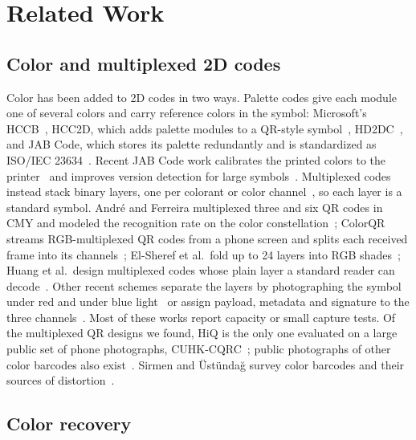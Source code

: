 \section{Related Work}
\label{sec:related}

\subsection{Color and multiplexed 2D codes}

Color has been added to 2D codes in two ways. Palette codes give each module one of
several colors and carry reference colors in the symbol: Microsoft's
HCCB~\cite{parikh2008hccb}, HCC2D, which adds palette modules to a QR-style
symbol~\cite{grillo2010hcc2d}, HD2DC~\cite{melgar2019hd2dc}, and JAB Code, which stores its
palette redundantly and is standardized as ISO/IEC 23634~\cite{berchtold2020jab,iso23634}.
Recent JAB Code work calibrates the printed colors to the printer~\cite{bugert2024calib}
and improves version detection for large symbols~\cite{bugert2025version}. Multiplexed
codes instead stack binary layers, one per colorant or color
channel~\cite{bulan2011elliptical,blasinski2013pccc}, so each layer is a standard symbol. Andr\'e and Ferreira multiplexed three and six QR codes in CMY and modeled
the recognition rate on the color constellation~\cite{andre2014colour}; ColorQR streams
RGB-multiplexed QR codes from a phone screen and splits each received frame into its
channels~\cite{toh2016colorqr}; El-Sheref et al.\ fold up to 24 layers into RGB
shades~\cite{elsheref2020fmt}; Huang et al.\ design multiplexed codes whose plain layer a
standard reader can decode~\cite{huang2022mc2d,huang2023halftone}. Other recent schemes
separate the layers by photographing the symbol under red and under blue
light~\cite{sanagustin2025chromatic} or assign
payload, metadata and signature to the three channels~\cite{wahsheh2026rgb}. Most of these
works report capacity or small capture tests. Of the multiplexed QR designs we found, HiQ is
the only one evaluated on a large public set of phone photographs,
CUHK-CQRC~\cite{yang2016hiq,yang2018hiq}; public photographs of other color barcodes also
exist~\cite{lecca2024coco}. Sirmen and \"Ust\"unda\u{g} survey color barcodes and their
sources of distortion~\cite{sirmen2023survey}.

\subsection{Color recovery}

